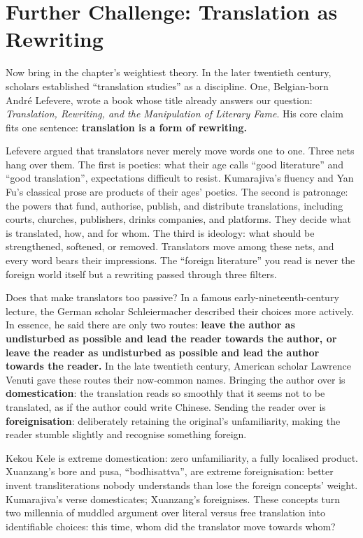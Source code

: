 \section[Further Challenge: Translation as Rewriting]{Further Challenge: Translation as Rewriting}
Now bring in the chapter's weightiest theory. In the later twentieth century, scholars established ``translation studies'' as a discipline. One, Belgian-born André Lefevere, wrote a book whose title already answers our question: \emph{Translation, Rewriting, and the Manipulation of Literary Fame}. His core claim fits one sentence: \textbf{translation is a form of rewriting.}

Lefevere argued that translators never merely move words one to one. Three nets hang over them. The first is poetics: what their age calls ``good literature'' and ``good translation'', expectations difficult to resist. Kumarajiva's fluency and Yan Fu's classical prose are products of their ages' poetics. The second is patronage: the powers that fund, authorise, publish, and distribute translations, including courts, churches, publishers, drinks companies, and platforms. They decide what is translated, how, and for whom. The third is ideology: what should be strengthened, softened, or removed. Translators move among these nets, and every word bears their impressions. The ``foreign literature'' you read is never the foreign world itself but a rewriting passed through three filters.

Does that make translators too passive? In a famous early-nineteenth-century lecture, the German scholar Schleiermacher described their choices more actively. In essence, he said there are only two routes: \textbf{leave the author as undisturbed as possible and lead the reader towards the author, or leave the reader as undisturbed as possible and lead the author towards the reader.} In the late twentieth century, American scholar Lawrence Venuti gave these routes their now-common names. Bringing the author over is \textbf{domestication}: the translation reads so smoothly that it seems not to be translated, as if the author could write Chinese. Sending the reader over is \textbf{foreignisation}: deliberately retaining the original's unfamiliarity, making the reader stumble slightly and recognise something foreign.

Kekou Kele is extreme domestication: zero unfamiliarity, a fully localised product. Xuanzang's bore and pusa, ``bodhisattva'', are extreme foreignisation: better invent transliterations nobody understands than lose the foreign concepts' weight. Kumarajiva's verse domesticates; Xuanzang's foreignises. These concepts turn two millennia of muddled argument over literal versus free translation into identifiable choices: this time, whom did the translator move towards whom?

